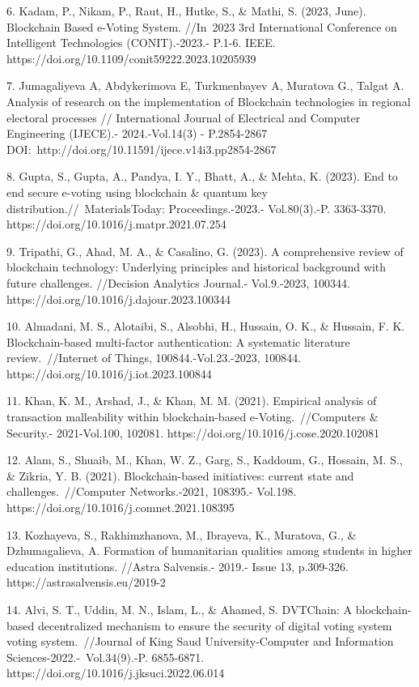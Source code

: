6. Kadam, P., Nikam, P., Raut, H., Hutke, S., \& Mathi, S. (2023, June).
Blockchain Based e-Voting System. //In~2023 3rd International Conference
on Intelligent Technologies (CONIT).-2023.- P.1-6. IEEE.
https://doi.org/10.1109/conit59222.2023.10205939

7. Jumagaliyeva A, Abdykerimova E, Turkmenbayev A, Muratova G., Talgat
A. Analysis of research on the implementation of Blockchain technologies
in regional electoral processes // International Journal of Electrical
and Computer Engineering (IJECE).- 2024.-Vol.14(3) - P.2854-2867
DOI:~http://doi.org/10.11591/ijece.v14i3.pp2854-2867

8. Gupta, S., Gupta, A., Pandya, I. Y., Bhatt, A., \& Mehta, K. (2023).
End to end secure e-voting using blockchain \& quantum key
distribution.//~MaterialsToday: Proceedings.-2023.- Vol.80(3).-P.
3363-3370. https://doi.org/10.1016/j.matpr.2021.07.254

9. Tripathi, G., Ahad, M. A., \& Casalino, G. (2023). A comprehensive
review of blockchain technology: Underlying principles and historical
background with future challenges. //Decision Analytics Journal.-
Vol.9.-2023, 100344. https://doi.org/10.1016/j.dajour.2023.100344

10. Almadani, M. S., Alotaibi, S., Alsobhi, H., Hussain, O. K., \&
Hussain, F. K. Blockchain-based multi-factor authentication: A
systematic literature review.~//Internet of Things,
100844.-Vol.23.-2023, 100844. https://doi.org/10.1016/j.iot.2023.100844

11. Khan, K. M., Arshad, J., \& Khan, M. M. (2021). Empirical analysis
of transaction malleability within blockchain-based
e-Voting.~//Computers \& Security.- 2021-Vol.100, 102081.
https://doi.org/10.1016/j.cose.2020.102081

12. Alam, S., Shuaib, M., Khan, W. Z., Garg, S., Kaddoum, G., Hossain,
M. S., \& Zikria, Y. B. (2021). Blockchain-based initiatives: current
state and challenges.~//Computer Networks.-2021, 108395.- Vol.198.
https://doi.org/10.1016/j.comnet.2021.108395

13. Kozhayeva, S., Rakhimzhanova, M., Ibrayeva, K., Muratova, G., \&
Dzhumagalieva, A. Formation of humanitarian qualities among students in
higher education institutions. //Astra Salvensis.- 2019.- Issue 13,
p.309-326. https://astrasalvensis.eu/2019-2

14. Alvi, S. T., Uddin, M. N., Islam, L., \& Ahamed, S. DVTChain: A
blockchain-based decentralized mechanism to ensure the security of
digital voting system voting system.~//Journal of King Saud
University-Computer and Information Sciences-2022.-~Vol.34(9).-P.
6855-6871. https://doi.org/10.1016/j.jksuci.2022.06.014


